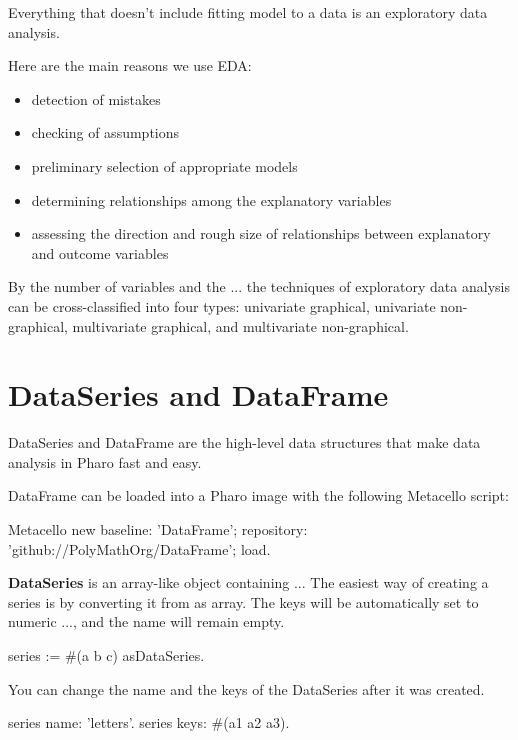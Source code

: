 \documentclass{article}
\begin{document}
\begin{multicols}{2}
Everything that doesn't include fitting model to a data is an exploratory data analysis.

Here are the main reasons we use EDA:
\begin{itemize}
  \item detection of mistakes
  \item checking of assumptions
  \item preliminary selection of appropriate models
  \item determining relationships among the explanatory variables
  \item assessing the direction and rough size of relationships between explanatory and outcome variables
\end{itemize}

By the number of variables and the ... the techniques of exploratory data analysis can be cross-classified into four types: univariate graphical, univariate non-graphical, multivariate graphical, and multivariate non-graphical.

\section{DataSeries and DataFrame}
\label{sec:dataframe}
DataSeries and DataFrame are the high-level data structures that make data analysis in Pharo fast and easy.
\cite{McKinney}

DataFrame can be loaded into a Pharo image with the following Metacello script:
\begin{code}{}
Metacello new
  baseline: 'DataFrame';
  repository: 'github://PolyMathOrg/DataFrame';
  load.
\end{code}

\textbf{DataSeries} is an array-like object containing ...
The easiest way of creating a series is by converting it from as array. The keys will be automatically set to numeric ..., and the name will remain empty. 

\begin{code}{}
series := #(a b c) asDataSeries.
\end{code}

You can change the name and the keys of the DataSeries after it was created.

\begin{code}{}
series name: 'letters'.
series keys: #(a1 a2 a3).
\end{code}


\end{multicols}
\end{document}
